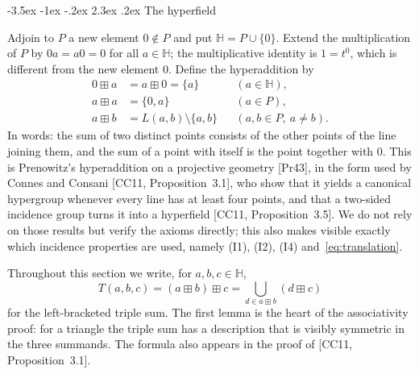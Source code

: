 \documentclass[11pt]{article}
\makeatletter
\renewcommand\section{\@startsection{section}{1}{\z@}
  {-3.5ex \@plus -1ex \@minus -.2ex}
  {2.3ex \@plus.2ex}
  {\normalfont\bfseries}}
\theoremstyle{plain}
\theoremstyle{definition}
\newcommand{\Hh}{\mathbb{H}}
\newcommand{\bp}{\boxplus}
\makeatother
\begin{document}
\section{The hyperfield}\label{sec:hyperfield}

Adjoin to $P$ a new element $0\notin P$ and put $\Hh=P\cup\{0\}$.
Extend the multiplication of $P$ by $0a=a0=0$ for all $a\in\Hh$; the
multiplicative identity is $1=t^0$, which is different from the new
element $0$.  Define the hyperaddition by
\begin{equation}\label{eq:addition}
 \begin{aligned}
 0\bp a&=a\bp0=\{a\} &&(a\in\Hh),\\
 a\bp a&=\{0,a\} &&(a\in P),\\
 a\bp b&=L(a,b)\setminus\{a,b\}
       &&(a,b\in P,\ a\neq b).
 \end{aligned}
\end{equation}
In words: the sum of two distinct points consists of the other points of
the line joining them, and the sum of a point with itself is the point
together with $0$.  This is Prenowitz's hyperaddition on a projective
geometry [Pr43], in the form used by Connes and Consani
[CC11, Proposition~3.1], who show that it yields a canonical hypergroup
whenever every line has at least four points, and that a two-sided
incidence group turns it into a hyperfield [CC11, Proposition~3.5].  We
do not rely on those results but verify the axioms directly; this also
makes visible exactly which incidence properties are used, namely
(I1), (I2), (I4) and~\eqref{eq:translation}. 

Throughout this section we write, for $a,b,c\in\Hh$,
\[
 T(a,b,c)=(a\bp b)\bp c=\bigcup_{d\in a\bp b}(d\bp c)
\]
for the left-bracketed triple sum.  The first lemma is the heart of the
associativity proof: for a triangle the triple sum has a description
that is visibly symmetric in the three summands.  The formula also
appears in the proof of [CC11, Proposition~3.1].
\end{document}
